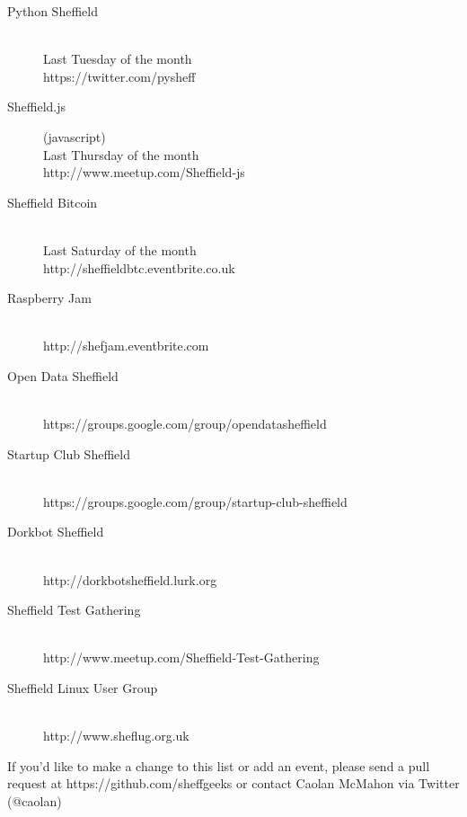 \documentclass[a4paper,twocolumn]{article}
\begin{document}
\begin{description}
  \item[Python Sheffield] \hfill \\
      Last Tuesday of the month \\
      https://twitter.com/pysheff

  \item[Sheffield.js] (javascript) \hfill \\
      Last Thursday of the month \\
      http://www.meetup.com/Sheffield-js

  \item[Sheffield Bitcoin] \hfill \\
      Last Saturday of the month \\
      http://sheffieldbtc.eventbrite.co.uk

  \item[Raspberry Jam] \hfill \\
      http://shefjam.eventbrite.com

  \item[Open Data Sheffield] \hfill \\
      https://groups.google.com/group/opendatasheffield

  \item[Startup Club Sheffield] \hfill \\
      https://groups.google.com/group/startup-club-sheffield

  \item[Dorkbot Sheffield] \hfill \\
      http://dorkbotsheffield.lurk.org

  \item[Sheffield Test Gathering] \hfill \\
      http://www.meetup.com/Sheffield-Test-Gathering

  \item[Sheffield Linux User Group] \hfill \\
      http://www.sheflug.org.uk

\end{description}

\qquad

If you'd like to make a change to this list or add an event,
please send a pull request at https://github.com/sheffgeeks or
contact Caolan McMahon via Twitter (@caolan)
\end{document}
